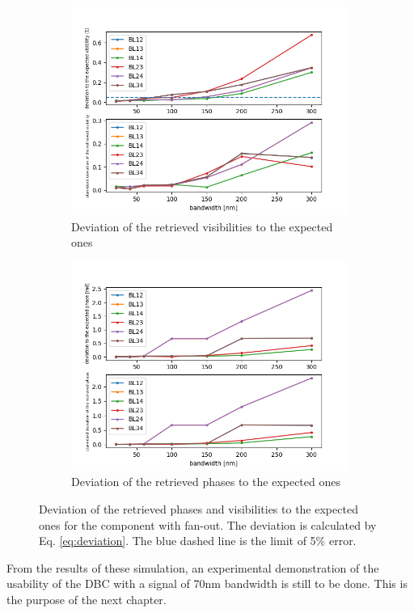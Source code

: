 \begin{figure}[htbp]
    \centering
    \begin{subfigure}{.45\textwidth}
        \includegraphics[scale=.45]{picture/retrieval_simu/visi_retrieved_fan.png}
        \caption{Deviation  of the retrieved visibilities to the expected ones}
    \end{subfigure}%
    \begin{subfigure}{.45\textwidth}
    \includegraphics[scale=.45]{picture/retrieval_simu/phase_retrieved_fan.png}
    \caption{Deviation of the retrieved phases to the expected ones}
    \end{subfigure}
    \caption{Deviation of the retrieved phases and visibilities to the expected ones for the component with fan-out. The deviation is calculated by Eq. \ref{eq:deviation}. The blue dashed line is the limit of 5\% error.}
    \label{fig:retrieved_fan}
\end{figure}

From the results of these simulation, an experimental demonstration of the usability of the DBC with a signal of 70nm bandwidth is still to be done. This is the purpose of the next chapter.
